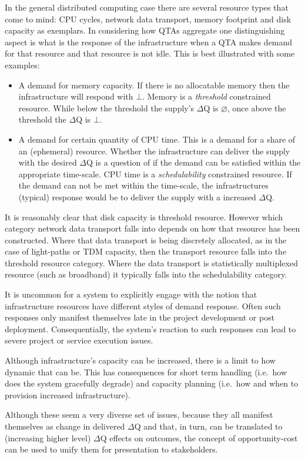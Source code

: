 \documentclass[11pt,a4paper]{article}
\begin{document}
\begin{description}
 In the general distributed computing case there are several resource
 types that come to mind: CPU cycles, network data transport, memory
 footprint and disk capacity as exemplars. In considering how QTAs
 aggregate one distinguishing aspect is what is the response of the
 infrastructure when a QTA makes demand for that resource and that
 resource is not idle. This is best illustrated with some examples:
 \begin{itemize}
   \item A demand for memory capacity. If there is no allocatable
     memory then the infrastructure will respond with $\bot$. Memory
     is a \textit{threshold} constrained resource.  While below the
     threshold the supply's $\Delta$Q is $\varnothing$, once above the
     threshold the $\Delta$Q is $\bot$.
   \item A demand for certain quantity of CPU time. This is a demand
     for a share of an (ephemeral) resource. Whether the
     infrastructure can deliver the supply with the desired $\Delta$Q
     is a question of if the demand can be satisfied within the
     appropriate time-scale. CPU time is a \textit{schedulability}
     constrained resource.  If the demand can not be met within the
     time-scale, the infrastructures (typical) response would be to
     deliver the supply with a increased $\Delta$Q.
 \end{itemize}
 
 It is reasonably clear that disk capacity is threshold
 resource. However which category network data transport falls into
 depends on how that resource has been constructed.  Where that data
 transport is being discretely allocated, as in the case of
 light-paths or TDM capacity, then the transport resource falls into
 the threshold resource category.  Where the data transport is
 statistically multiplexed resource (such as broadband) it typically
 falls into the schedulability category.
 
 It is uncommon for a system to explicitly engage with the notion that
 infrastructure resources have different styles of demand
 response. Often such responses only manifest themselves late in the
 project development or post deployment. Consequentially, the system's
 reaction to such responses can lead to severe project or service
 execution issues.
 
 Although infrastructure's capacity can be increased, there is a limit
 to how dynamic that can be. This has consequences for short term
 handling (i.e.\ how does the system gracefully degrade) and capacity
 planning (i.e.\ how and when to provision increased infrastructure).
 
 Although these seem a very diverse set of issues, because they all
 manifest themselves as change in delivered $\Delta$Q and that, in
 turn, can be translated to (increasing higher level) $\Delta$Q
 effects on outcomes, the concept of opportunity-cost can be used to
 unify them for presentation to stakeholders.
 
\end{description}
\end{document}
